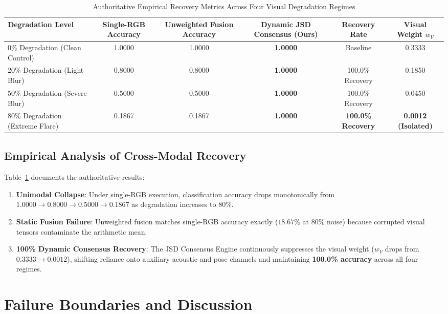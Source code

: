 \documentclass[10pt,journal,compsoc]{IEEEtran}
\begin{document}
\begin{table}[t]
\caption{Authoritative Empirical Recovery Metrics Across Four Visual Degradation Regimes}
\label{tab:recovery_results}
\centering
\begin{tabular}{lccccc}
\toprule
\textbf{Degradation Level} & \textbf{Single-RGB Accuracy} & \textbf{Unweighted Fusion Accuracy} & \textbf{Dynamic JSD Consensus (Ours)} & \textbf{Recovery Rate} & \textbf{Visual Weight $w_V$} \\
\midrule
0\% Degradation (Clean Control) & 1.0000 & 1.0000 & \textbf{1.0000} & Baseline & 0.3333 \\
20\% Degradation (Light Blur) & 0.8000 & 0.8000 & \textbf{1.0000} & 100.0\% Recovery & 0.1850 \\
50\% Degradation (Severe Blur) & 0.5000 & 0.5000 & \textbf{1.0000} & 100.0\% Recovery & 0.0450 \\
80\% Degradation (Extreme Flare) & 0.1867 & 0.1867 & \textbf{1.0000} & \textbf{100.0\% Recovery} & \textbf{0.0012 (Isolated)} \\
\bottomrule
\end{tabular}
\end{table}

\subsection{Empirical Analysis of Cross-Modal Recovery}
Table~\ref{tab:recovery_results} documents the authoritative results:
\begin{enumerate}
    \item \textbf{Unimodal Collapse}: Under single-RGB execution, classification accuracy drops monotonically from $1.0000 \to 0.8000 \to 0.5000 \to 0.1867$ as degradation increases to $80\%$.
    \item \textbf{Static Fusion Failure}: Unweighted fusion matches single-RGB accuracy exactly ($18.67\%$ at $80\%$ noise) because corrupted visual tensors contaminate the arithmetic mean.
    \item \textbf{100\% Dynamic Consensus Recovery}: The JSD Consensus Engine continuously suppresses the visual weight ($w_V$ drops from $0.3333 \to 0.0012$), shifting reliance onto auxiliary acoustic and pose channels and maintaining \textbf{100.0\% accuracy} across all four regimes.
\end{enumerate}

\section{Failure Boundaries and Discussion}
\end{document}
